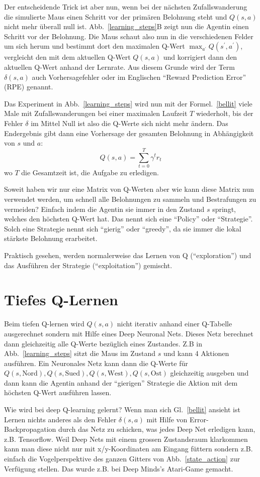\documentclass[12pt]{article}
\begin{document}
Der entscheidende Trick ist aber nun, wenn bei der nächsten
Zufallswanderung die simulierte Maus einen Schritt vor der primären
Belohnung steht und $Q(s,a)$ nicht mehr überall null
ist. Abb.~\ref{learning_steps}B zeigt nun die Agentin einen Schritt
vor der Belohnung. Die Maus schaut also nun in die verschiedenen
Felder um sich herum und bestimmt dort den maximalen Q-Wert
$\max_{a^\prime} Q(s^\prime,a^\prime)$, vergleicht den mit dem
aktuellen Q-Wert $Q(s,a)$ und korrigiert dann den aktuellen Q-Wert
anhand der Lernrate. Aus diesem Grunde wird der Term $\delta(s,a)$
auch Vorhersagefehler oder im Englischen ``Reward Prediction Error''
(RPE) genannt.

Das Experiment in Abb.~\ref{learning_steps} wird nun mit der
Formel.~\ref{bellit} viele Male mit Zufallswanderungen bei einer
maximalen Laufzeit $T$ wiederholt, bis der Fehler $\delta$ im Mittel
Null ist also die Q-Werte sich nicht mehr ändern. Das Endergebnis gibt
dann eine Vorhersage der gesamten Belohnung in Abhängigkeit von $s$
und $a$:
\begin{equation}
  Q(s,a) = \sum_{t=0}^T \gamma^t r_t
\end{equation}
wo $T$ die Gesamtzeit ist, die Aufgabe zu erledigen.

Soweit haben wir nur eine Matrix von Q-Werten aber wie kann diese
Matrix nun verwendet werden, um schnell alle Belohnungen zu sammeln
und Bestrafungen zu vermeiden? Einfach indem die Agentin sie immer in
den Zustand $s$ springt, welches den höchsten Q-Wert hat. Das nennt
sich eine ``Policy'' oder ``Strategie''. Solch eine Strategie
nennt sich ``gierig'' oder ``greedy'', da sie immer die lokal stärkste
Belohnung erarbeitet.

Praktisch gesehen, werden normalerweise das Lernen von Q
(``exploration'') und das Ausführen der Strategie (``exploitation'')
gemischt.

\section{Tiefes Q-Lernen}
Beim tiefen Q-lernen wird $Q(s,a)$ nicht iterativ anhand einer Q-Tabelle
ausgerechnet sondern mit Hilfe eines Deep Neuronal Nets. Dieses Netz
berechnet dann gleichzeitig alle Q-Werte bezüglich eines
Zustandes. Z.B in Abb.~\ref{learning_steps} sitzt die Maus im Zustand
$s$ und kann 4 Aktionen ausführen. Ein Neuronales Netz kann dann die
Q-Werte für $Q(s,\textrm{Nord}), Q(s,\textrm{Sued}),
Q(s,\textrm{West}), Q(s,\textrm{Ost})$ gleichzeitig ausgeben und dann
kann die Agentin anhand der ``gierigen'' Strategie die Aktion mit dem
höchsten Q-Wert ausführen lassen.

Wie wird bei deep Q-learning gelernt? Wenn man sich
Gl.~\ref{bellit} ansieht ist Lernen nichts anderes als den
Fehler $\delta(s,a)$ mit Hilfe von Error-Backpropagation durch das
Netz zu schicken, was jedes Deep Net erledigen kann,
z.B. Tensorflow. Weil Deep Nets mit einem grossen Zustandsraum
klarkommen kann man diese nicht nur mit x/y-Koordinaten am Eingang
füttern sondern z.B. einfach die Vogelperspektive des ganzen Gitters
von Abb.~\ref{state_action} zur Verfügung stellen. Das wurde z.B. bei
Deep Minds's Atari-Game gemacht.
\end{document}
